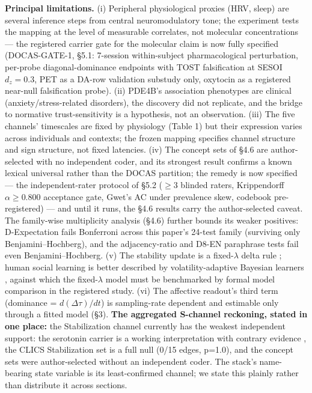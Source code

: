 \documentclass[
]{article}
\begin{document}
\textbf{Principal limitations.} (i) Peripheral physiological proxies
(HRV, sleep) are several inference steps from central neuromodulatory
tone; the experiment tests the mapping at the level of measurable
correlates, not molecular concentrations --- the registered carrier gate
for the molecular claim is now fully specified (DOCAS-GATE-1, §5.1:
7-session within-subject pharmacological perturbation, per-probe
diagonal-dominance endpoints with TOST falsification at SESOI
\(d_z = 0.3\), PET as a DA-row validation substudy only, oxytocin as a
registered near-null falsification probe). (ii) PDE4B's association
phenotypes are clinical (anxiety/stress-related disorders), the
discovery did not replicate, and the bridge to normative
trust-sensitivity is a hypothesis, not an observation. (iii) The five
channels' timescales are fixed by physiology (Table 1) but their
expression varies across individuals and contexts; the frozen mapping
specifies channel structure and sign structure, not fixed latencies.
(iv) The concept sets of §4.6 are author-selected with no independent
coder, and its strongest result confirms a known lexical universal
rather than the DOCAS partition; the remedy is now specified --- the
independent-rater protocol of §5.2 (\(\geq\)3 blinded raters,
Krippendorff \(\alpha \geq 0.800\) acceptance gate, Gwet's AC under
prevalence skew, codebook pre-registered) --- and until it runs, the
§4.6 results carry the author-selected caveat. The family-wise
multiplicity analysis (§4.6) further bounds its weaker positives:
D-Expectation fails Bonferroni across this paper's 24-test family
(surviving only Benjamini--Hochberg), and the adjacency-ratio and D8-EN
paraphrase tests fail even Benjamini--Hochberg. (v) The stability update
is a fixed-\(\lambda\) delta rule ; human social learning is better
described by volatility-adaptive Bayesian learners , against which the
fixed-\(\lambda\) model must be benchmarked by formal model comparison
in the registered study. (vi) The affective readout's third term
(dominance = \(d(\Delta\tau)/dt\)) is sampling-rate dependent and
estimable only through a fitted model (§3). \textbf{The aggregated
S-channel reckoning, stated in one place:} the Stabilization channel
currently has the weakest independent support: the serotonin carrier is
a working interpretation with contrary evidence , the CLICS
Stabilization set is a full null (0/15 edges, p=1.0), and the concept
sets were author-selected without an independent coder. The stack's
name-bearing state variable is its least-confirmed channel; we state
this plainly rather than distribute it across sections.
\end{document}
